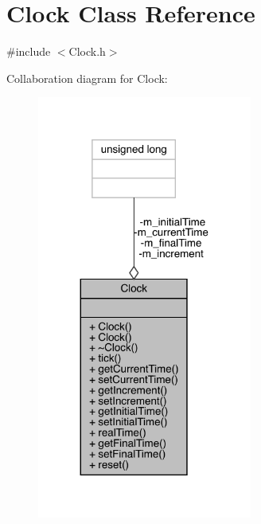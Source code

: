 \hypertarget{class_clock}{}\section{Clock Class Reference}
\label{class_clock}


{\ttfamily \#include $<$Clock.\+h$>$}



Collaboration diagram for Clock\+:\nopagebreak
\begin{figure}[H]
\begin{center}
\leavevmode
\includegraphics[width=200pt]{class_clock__coll__graph}
\end{center}
\end{figure}
